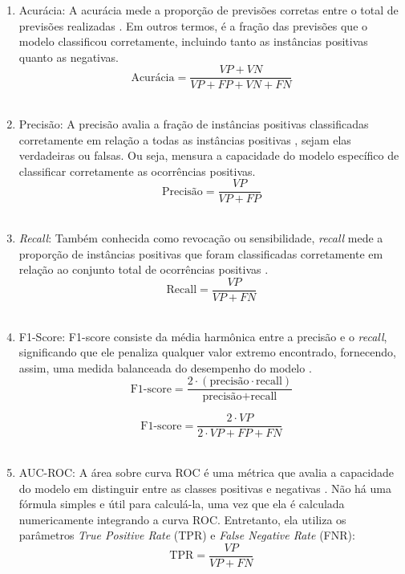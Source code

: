 \documentclass[conference]{IEEEtran}
\begin{document}
\begin{enumerate}
    \item Acurácia: A acurácia mede a proporção de previsões corretas entre o total de previsões realizadas \cite{Shwartz}. Em outros termos, é a fração das previsões que o modelo classificou corretamente, incluindo tanto as instâncias positivas quanto as negativas.
    \begin{equation}
    \text{Acur\'{a}cia} = \frac{VP + VN}{VP + FP + VN + FN}
    \end{equation} \\
    
    \item Precisão: A precisão avalia a fração de instâncias positivas classificadas corretamente em relação a todas as instâncias positivas \cite{IF}, sejam elas verdadeiras ou falsas. Ou seja, mensura a capacidade do modelo específico de classificar corretamente as ocorrências positivas.
    \begin{equation}
    \text{Precis\~{a}o} = \frac{VP}{VP + FP}
    \end{equation} \\
    
    \item \textit{Recall}: Também conhecida como revocação ou sensibilidade, \textit{recall} mede a proporção de instâncias positivas que foram classificadas corretamente em relação ao conjunto total de ocorrências positivas \cite{Google}.
    \begin{equation}
    \text{Recall} = \frac{VP}{VP + FN}
    \end{equation} \\
    
    \item F1-Score: F1-score consiste da média harmônica entre a precisão e o \textit{recall}, significando que ele penaliza qualquer valor extremo encontrado, fornecendo, assim, uma medida balanceada do desempenho do modelo \cite{Hicks2022}.
    \begin{equation}
    \text{F1-score} = \frac{2 \cdot (\text{precisão} \cdot \text{recall})}{\text{precisão} +    \text{recall}} 
    \end{equation} 
    
    \begin{equation}
    \text{F1-score} = \frac{2 \cdot VP}{2 \cdot VP + FP + FN}
    \end{equation} \\
    
    \item AUC-ROC: A área sobre curva ROC é uma métrica que avalia a capacidade do modelo em distinguir entre as classes positivas e negativas \cite{medium}. Não há uma fórmula simples e útil para calculá-la, uma vez que ela é calculada numericamente integrando a curva ROC. Entretanto, ela utiliza os parâmetros \textit{True Positive Rate} (TPR) e \textit{False Negative Rate} (FNR):
    \begin{equation}
    \text{TPR} = \frac{VP}{VP + FN}
    \end{equation}
    

\end{enumerate}
\end{document}
